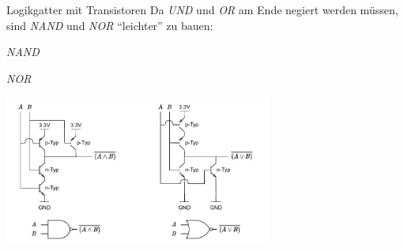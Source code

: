 \begin{bonus}{Logikgatter mit Transistoren}
    Da \emph{UND} und \emph{OR} am Ende negiert werden müssen, sind \emph{NAND} und \emph{NOR} \enquote{leichter} zu bauen:

    \begin{center}
        \begin{minipage}[t]{0.33\textwidth}
            \begin{center}
                \emph{NAND}
            \end{center}
        \end{minipage}
        \begin{minipage}[t]{0.33\textwidth}
            \begin{center}
                \emph{NOR}
            \end{center}
        \end{minipage}

        \includegraphics[width=0.66\textwidth]{includes/figures/bonus_logikgatter.pdf}


\end{center}
\end{bonus}
